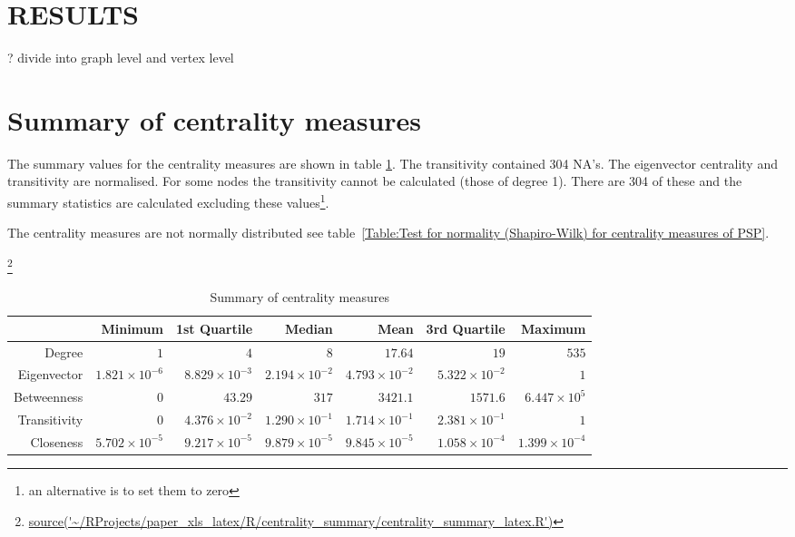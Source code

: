 


\section{RESULTS}
? divide into graph level and vertex level

\section{Summary of centrality measures}

The summary values for the centrality measures are shown in table \ref{Table:Summary of centrality measures}. The transitivity contained 304 NA's.
The eigenvector centrality and transitivity are normalised. For some nodes the transitivity cannot be calculated (those of degree 1). There are 304 of these and the summary statistics are calculated excluding these values\footnote{an alternative is to set them to zero}. 

The centrality measures are not normally distributed see table~\ref{Table:Test for normality (Shapiro-Wilk) for centrality measures of PSP}.



\footnote{\url{source('~/RProjects/paper_xls_latex/R/centrality_summary/centrality_summary_latex.R')}}
\begin{table}[ht]
\centering
\begin{tabular}{rrrrrrr}
  \hline
 & Minimum & 1st Quartile & Median & Mean & 3rd Quartile & Maximum \\ 
  \hline
Degree & $1 $ & $4 $ & $8 $ & $17.64$  & $19$ & $535$ \\ 
  Eigenvector & $1.821 \times 10^{-6}$ & $8.829 \times 10^{-3}$ & $2.194 \times 10^{-2}$ & $4.793 \times 10^{-2}$ & $5.322 \times 10^{-2}$ & $1 $ \\ 
  Betweenness & $0 $ & $43.29 $ & $317 $ & $3421.1$ & $1571.6$& $6.447 \times 10^{5}$ \\ 
  Transitivity & $0 $ & $4.376 \times 10^{-2}$ & $1.290 \times 10^{-1}$ & $1.714 \times 10^{-1}$ & $2.381 \times 10^{-1}$ & $1 $ \\ 
  Closeness & $5.702 \times 10^{-5}$ & $9.217 \times 10^{-5}$ & $9.879 \times 10^{-5}$ & $9.845 \times 10^{-5}$ & $1.058 \times 10^{-4}$ & $1.399 \times 10^{-4}$ \\ 
   \hline
\end{tabular}
\caption{Summary of centrality measures} 
\label{Table:Summary of centrality measures}
\end{table}


